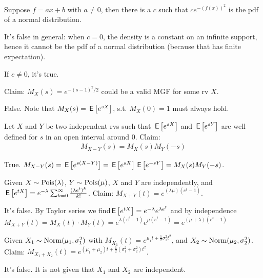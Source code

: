 \documentclass[tf-tutorial-all.tex]{subfiles}
\begin{document}
\begin{truefalse}
Suppose $f = a x + b$ with $a\neq 0$, then there is a $c$ such that $c e^{-(f(x))^2}$ is the pdf of a normal distribution.
\begin{solution}
It's false in general: when $c=0$, the density is a constant on an infinite support, hence it cannot be the pdf of a normal distribution (because that has finite expectation).

If $c\neq 0$, it's true.
\end{solution}
\end{truefalse}


\begin{truefalse}
Claim: $M_X(s)=e^{-(s-1)^2/2}$ could be a valid MGF for some rv $X$.
\begin{solution}
False. Note that $M_X(s)=\,\mathsf{E}\left[e^{sX}\right]$, s.t. $M_X(0)=1$ must always hold.
\end{solution}
\end{truefalse}


\begin{truefalse}
Let $X$ and $Y$ be two independent rvs such that $\,\mathsf{E}\left[e^{s X}\right]$ and $\,\mathsf{E}\left[e^{s Y}\right]$ are well defined for $s$ in an open interval around $0$.
Claim:
\begin{align}
\label{eq:2}
M_{X-Y}(s)=M_X(s)M_Y(-s)
\end{align}
\begin{solution}
True. $M_{X-Y}(s)=\,\mathsf{E}\left[e^{s(X-Y)}\right]=\,\mathsf{E}\left[e^{sX}\right]\,\mathsf{E}\left[e^{-sY}\right]=M_X(s)M_Y(-s)$.
\end{solution}
\end{truefalse}

\begin{truefalse}
Given $X\sim \mathrm{Pois}(\lambda)$, $Y \sim \mathrm{Pois}(\mu)$, $X$ and $Y$ are independently, and $\,\mathsf{E}\left[e^{tX}\right] = e^{-\lambda}\sum^{\infty}_{k=0} \frac{(\lambda e^t)^k}{k!}$.
Claim: $M_{X+Y}(t) = e^{(\lambda \mu)(e^t-1)}$.
\begin{solution}
It's false. By Taylor series we find$ \,\mathsf{E}\left[e^{tX}\right] = e^{-\lambda} e^{\lambda e^t}$ and by independence $M_{X+Y}(t) = M_X(t) \cdot M_Y(t) = e^{\lambda(e^t-1)} e^{\mu(e^t-1)} = e^{(\mu + \lambda)(e^t-1)}$
\end{solution}
\end{truefalse}


\begin{truefalse}
Given $X_1\sim \mathrm{Norm}(\mu_1, \sigma_1^2)$ with $M_{X_1}(t) = e^{\mu_1t + \frac{1}{2}\sigma_1^2t^2}$, and $X_2\sim \mathrm{Norm}(\mu_2, \sigma_2^2)$.
Claim: $M_{X_1+X_2}(t) = e^{(\mu_1 + \mu_2)t +\frac{1}{2}(\sigma_1^2 + \sigma_2^2)t^2}$.
\begin{solution}
It's false. It is not given that $X_1$ and $X_2$ are independent.
\end{solution}
\end{truefalse}
\end{document}
